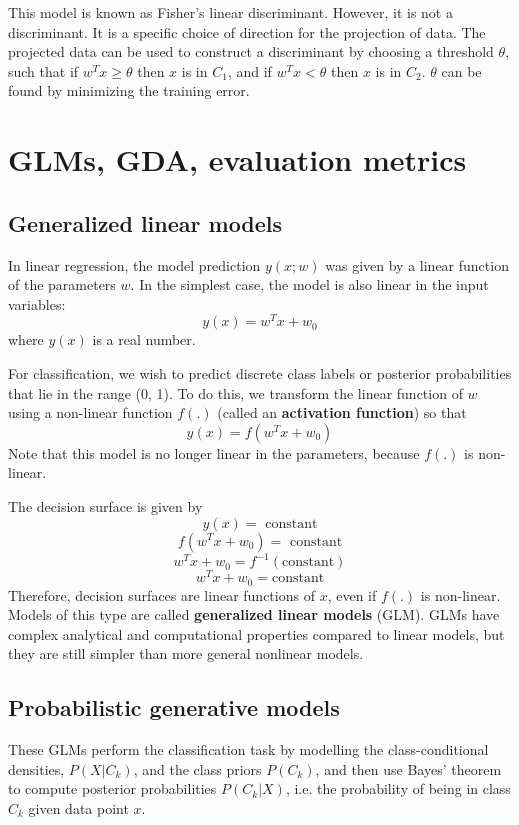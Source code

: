 \documentclass[a4paper,12pt]{article}
\begin{document}
This model is known as Fisher's linear discriminant. However, it is not a discriminant. It is a specific choice of direction for the projection of data. The projected data can be used to construct a discriminant by choosing a threshold $\theta$, such that if $w^Tx \geq \theta$ then $x$ is in $C_1$, and if $w^Tx < \theta$ then $x$ is in $C_2$. $\theta$ can be found by minimizing the training error. 


\clearpage

\section{GLMs, GDA, evaluation metrics}

\subsection{Generalized linear models}

In linear regression, the model prediction $y(x; w)$ was given by a linear function of the parameters $w$. In the simplest case, the model is also linear in the input variables: 
$$y(x) = w^Tx+w_0$$
where $y(x)$ is a real number. 

For classification, we wish to predict discrete class labels or posterior probabilities that lie in the range (0, 1). To do this, we transform the linear function of $w$ using a non-linear function $f(.)$ (called an \textbf{activation function}) so that 
$$y(x) = f(w^Tx + w_0)$$
Note that this model is no longer linear in the parameters, because $f(.)$ is non-linear. 

The decision surface is given by 
$$y(x) = \text{ constant}$$
$$f(w^Tx + w_0) = \text{ constant}$$
$$w^Tx + w_0 = f^{-1}(\text{constant})$$
$$w^Tx + w_0 = \text{constant}$$
Therefore, decision surfaces are linear functions of $x$, even if $f(.)$ is non-linear. Models of this type are called \textbf{generalized linear models} (GLM). GLMs have complex analytical and computational properties compared to linear models, but they are still simpler than more general nonlinear models. 

\subsection{Probabilistic generative models}

These GLMs perform the classification task by modelling the class-conditional densities, $P(X|C_k)$, and the class priors $P(C_k)$, and then use Bayes' theorem to compute posterior probabilities $P(C_k|X)$, i.e. the probability of being in class $C_k$ given data point $x$. 
\end{document}
